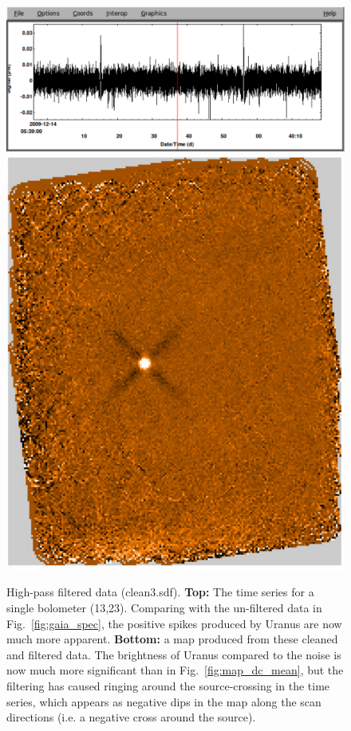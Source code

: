 \documentclass[twoside,11pt]{starlink}
\begin{document}
\begin{figure}
\begin{center}
\includegraphics[width=\linewidth]{sc19_spec_filt} \\
\vspace{0.3in}
\includegraphics[width=0.5\linewidth]{sc19_map_highpass}
\caption{High-pass filtered data (clean3.sdf). \textbf{Top:} The time
  series for a single bolometer (13,23). Comparing with the un-filtered
  data in Fig.~\ref{fig:gaia_spec}, the positive spikes produced by
  Uranus are now much more apparent. \textbf{Bottom:} a map produced from
  these cleaned and filtered data. The brightness of Uranus compared
  to the noise is now much more significant than in
  Fig.~\ref{fig:map_dc_mean}, but the filtering has caused ringing
  around the source-crossing in the time series, which appears as
  negative dips in the map along the scan directions (i.e. a negative
  cross around the source).}
\label{fig:highpass}
\end{center}
\end{figure}

\end{document}
